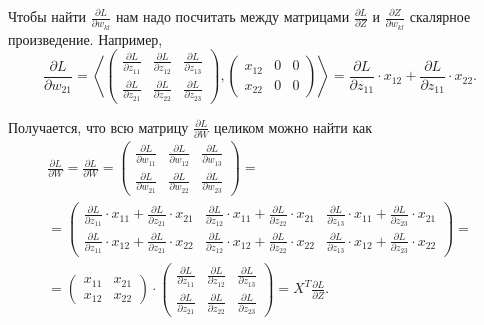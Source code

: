 \begin{sol}
Чтобы найти $\frac{\partial L}{\partial w_{kl}} $ нам надо посчитать между матрицами $\frac{\partial L}{\partial Z}$ и $\frac{\partial Z}{\partial w_{kl}}$ скалярное произведение. Например,
\[
\frac{\partial L}{\partial w_{21}} =  \left\langle  \begin{pmatrix} \frac{\partial L}{\partial z_{11}}  & \frac{\partial L}{\partial z_{12}} & \frac{\partial L}{\partial z_{13}} \\ \frac{\partial L}{\partial z_{21}}  & \frac{\partial L}{\partial z_{22}}  & \frac{\partial L}{\partial z_{23}}  \end{pmatrix} , \begin{pmatrix} x_{12} & 0 & 0 \\ x_{22} & 0 & 0 \end{pmatrix} \right \rangle = \frac{\partial L}{\partial z_{11}} \cdot x_{12} +   \frac{\partial L}{\partial z_{11}} \cdot x_{22}.
\]

Получается, что всю матрицу $\frac{\partial L}{\partial W}$ целиком можно найти как 
\begin{multline*}
\frac{\partial L}{\partial W} = \frac{\partial L}{\partial W} = \begin{pmatrix} \frac{\partial L}{\partial w_{11}}  & \frac{\partial L}{\partial w_{12}} & \frac{\partial L}{\partial w_{13}} \\ \frac{\partial L}{\partial w_{21}}  & \frac{\partial L}{\partial w_{22}}  & \frac{\partial L}{\partial w_{23}}  \end{pmatrix} = \\ = \begin{pmatrix}  \frac{\partial L}{\partial z_{11}} \cdot x_{11} + \frac{\partial L}{\partial z_{21}} \cdot x_{21} &  \frac{\partial L}{\partial z_{12}} \cdot x_{11} + \frac{\partial L}{\partial z_{22}} \cdot x_{21} & \frac{\partial L}{\partial z_{13}} \cdot x_{11} + \frac{\partial L}{\partial z_{23}} \cdot x_{21} \\ \frac{\partial L}{\partial z_{11}} \cdot x_{12} + \frac{\partial L}{\partial z_{21}} \cdot x_{22} &  \frac{\partial L}{\partial z_{12}} \cdot x_{12} + \frac{\partial L}{\partial z_{22}} \cdot x_{22} & \frac{\partial L}{\partial z_{13}} \cdot x_{12} + \frac{\partial L}{\partial z_{23}} \cdot x_{22} \end{pmatrix}  = \\ =  \begin{pmatrix} x_{11} & x_{21} \\ x_{12} & x_{22} \end{pmatrix} \cdot \begin{pmatrix} \frac{\partial L}{\partial z_{11}}  & \frac{\partial L}{\partial z_{12}} & \frac{\partial L}{\partial z_{13}} \\ \frac{\partial L}{\partial z_{21}}  & \frac{\partial L}{\partial z_{22}} & \frac{\partial L}{\partial z_{23}}  \end{pmatrix} = X^T \frac{\partial L}{\partial Z}.
\end{multline*}


\end{sol}
